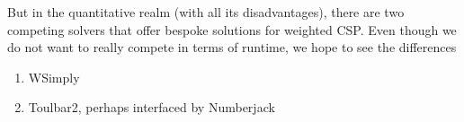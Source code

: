 But in the quantitative realm (with all its disadvantages), there are two competing solvers that 
offer bespoke solutions for weighted CSP. Even though we do not want to really compete in
terms of runtime, we hope to see the differences

\begin{enumerate}
\item WSimply 
\item Toulbar2, perhaps interfaced by Numberjack
\end{enumerate}


